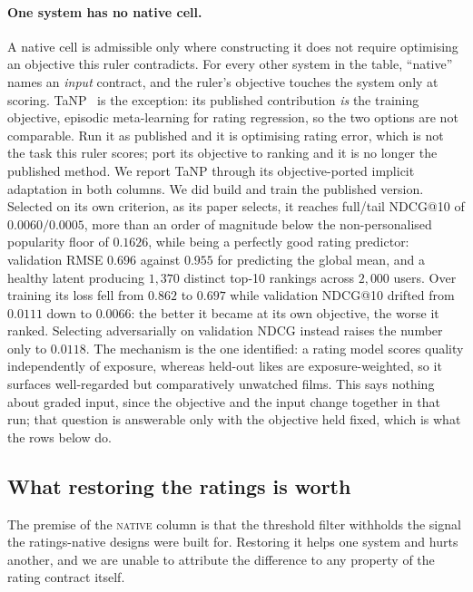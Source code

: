 \documentclass[acmsmall,review,anonymous]{acmart}
\begin{document}
\paragraph{One system has no native cell.}\label{sec:nativelimit} A native cell is admissible only where constructing it does not require optimising an objective this ruler contradicts. For every other system in the table, ``native'' names an \emph{input} contract, and the ruler's objective touches the system only at scoring. TaNP~\citep{lin2021tanp} is the exception: its published contribution \emph{is} the training objective, episodic meta-learning for rating regression, so the two options are not comparable. Run it as published and it is optimising rating error, which is not the task this ruler scores; port its objective to ranking and it is no longer the published method. We report TaNP through its objective-ported implicit adaptation in both columns. We did build and train the published version. Selected on its own criterion, as its paper selects, it reaches full/tail NDCG@10 of $0.0060/0.0005$, more than an order of magnitude below the non-personalised popularity floor of $0.1626$, while being a perfectly good rating predictor: validation RMSE $0.696$ against $0.955$ for predicting the global mean, and a healthy latent producing $1{,}370$ distinct top-10 rankings across $2{,}000$ users. Over training its loss fell from $0.862$ to $0.697$ while validation NDCG@10 drifted from $0.0111$ down to $0.0066$: the better it became at its own objective, the worse it ranked. Selecting adversarially on validation NDCG instead raises the number only to $0.0118$. The mechanism is the one \citet{cremonesi2010performance} identified: a rating model scores quality independently of exposure, whereas held-out likes are exposure-weighted, so it surfaces well-regarded but comparatively unwatched films. This says nothing about graded input, since the objective and the input change together in that run; that question is answerable only with the objective held fixed, which is what the rows below do.

\subsection{What restoring the ratings is worth}\label{sec:ratings}
The premise of the \textsc{native} column is that the threshold filter withholds the signal the ratings-native designs were built for. Restoring it helps one system and hurts another, and we are unable to attribute the difference to any property of the rating contract itself.
\end{document}
